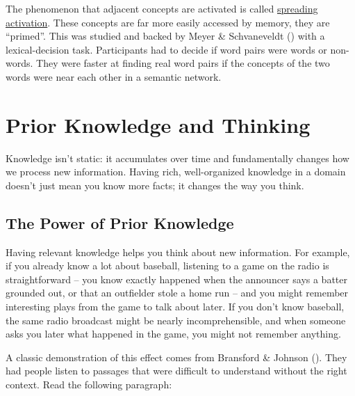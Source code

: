 \documentclass[
]{krantz}
\begin{document}
The phenomenon that adjacent concepts are activated is called \hyperref[spreading-activation]{spreading activation}. These concepts are far more easily accessed by memory, they are ``primed''. This was studied and backed by Meyer \& Schvaneveldt () with a lexical-decision task. Participants had to decide if word pairs were words or non-words. They were faster at finding real word pairs if the concepts of the two words were near each other in a semantic network.

\section{Prior Knowledge and Thinking}\label{prior-knowledge-and-thinking}

Knowledge isn't static: it accumulates over time and fundamentally changes how we process new information. Having rich, well-organized knowledge in a domain doesn't just mean you know more facts; it changes the way you think.

\subsection*{The Power of Prior Knowledge}\label{the-power-of-prior-knowledge}


Having relevant knowledge helps you think about new information. For example, if you already know a lot about baseball, listening to a game on the radio is straightforward -- you know exactly happened when the announcer says a batter grounded out, or that an outfielder stole a home run -- and you might remember interesting plays from the game to talk about later. If you don't know baseball, the same radio broadcast might be nearly incomprehensible, and when someone asks you later what happened in the game, you might not remember anything.

A classic demonstration of this effect comes from Bransford \& Johnson (). They had people listen to passages that were difficult to understand without the right context. Read the following paragraph:
\end{document}
